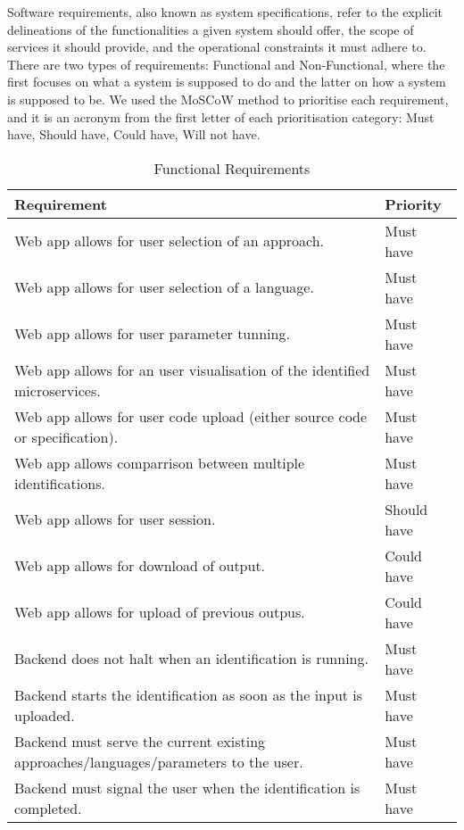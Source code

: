 Software requirements, also known as system specifications, refer to the explicit delineations of the functionalities a given system should offer, the scope of services it should provide, and the operational constraints it must adhere to.
There are two types of requirements: Functional and Non-Functional, where the first focuses on what a system is supposed to do and the latter on how a system is supposed to be.
We used the MoSCoW method to prioritise each requirement, and it is an acronym from the first letter of each prioritisation category: Must have, Should have, Could have, Will not have.

\begin{table}[!htb] \caption{Functional Requirements} \label{tab:functional-requirements}
  \begin{center}
    \begin{tabular}[c]{p{16em}|p{8em}}
      \textbf{Requirement} &
      \textbf{Priority} \\
      \hline Web app allows for user selection of an approach. & {Must have} \\
      \hline Web app allows for user selection of a language. & {Must have} \\
      \hline Web app allows for user parameter tunning. & {Must have} \\
      \hline Web app allows for an user visualisation of the identified microservices. & {Must have} \\
      \hline Web app allows for user code upload (either source code or specification). & {Must have} \\
      \hline Web app allows comparrison between multiple identifications. & {Must have} \\
      \hline Web app allows for user session. & {Should have} \\
      \hline Web app allows for download of output. & {Could have} \\
      \hline Web app allows for upload of previous outpus. & {Could have} \\
      \hline Backend does not halt when an identification is running. & {Must have} \\
      \hline Backend starts the identification as soon as the input is uploaded. & {Must have} \\
      \hline Backend must serve the current existing approaches/languages/parameters to the user. & {Must have} \\
      \hline Backend must signal the user when the identification is completed. & {Must have} \\

\end{tabular}
\end{center}
\end{table}
